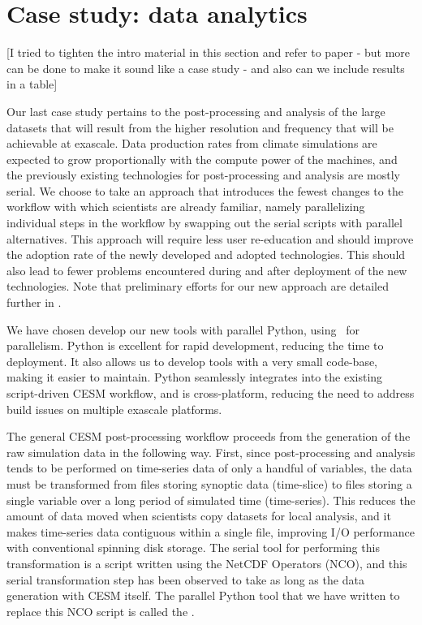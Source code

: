 \section{Case study: data analytics }\label{sec:postproc}

{\color{red} [I tried to tighten the intro material in this section and  refer to paper - but  more can be done to make it sound like a case study - and also can we include results in a table]}

Our last case study pertains to the post-processing and analysis of the large datasets that will result from 
the higher resolution and frequency that will be achievable at exascale.
Data production rates from climate simulations are expected to grow proportionally with the compute power of the machines, and the previously existing technologies for post-processing and analysis are mostly serial.  
We choose to take an approach that introduces the fewest changes to the workflow with which scientists are already familiar, namely parallelizing individual steps in the workflow by swapping out the serial scripts with parallel alternatives.  This approach will require less user re-education and should improve the adoption rate of the newly developed and adopted technologies.  This should also lead to fewer problems encountered during and after deployment of the new technologies. Note that preliminary efforts for our new approach are detailed further in \cite{paul2015}.

We have chosen develop our new tools with parallel Python, using \mpipy\ for parallelism.  Python is excellent for rapid development, reducing the time to deployment.  It also allows us to develop tools with a very small code-base, making it easier to maintain.  Python seamlessly integrates into the existing script-driven CESM workflow, and is cross-platform, reducing the need to address build issues on multiple exascale platforms.

The general CESM post-processing workflow proceeds from the generation of the raw simulation data in the following way.  First, since post-processing and analysis tends to be performed on time-series data of only a handful of variables, the data must be transformed from files storing synoptic data (time-slice) to files storing a single variable over a long period of simulated time (time-series).  This reduces the amount of data moved when scientists copy datasets for local analysis, and it makes time-series data contiguous within a single file, improving I/O performance with conventional spinning disk storage.  The serial tool for performing this transformation is a script written using the NetCDF Operators (NCO), and this serial transformation step has been observed to take as long as the data generation with CESM itself.  The parallel Python tool that we have written to replace this NCO script is called the \pyreshaper.

